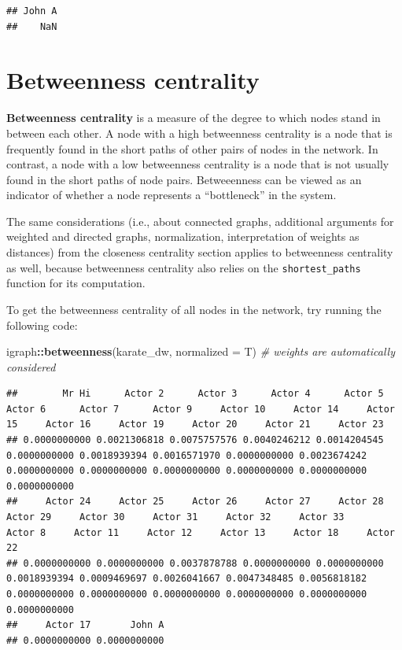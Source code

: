 \documentclass[
]{book}
\newenvironment{Shaded}{\begin{snugshade}}{\end{snugshade}}
\newcommand{\AttributeTok}[1]{\textcolor[rgb]{0.13,0.29,0.53}{#1}}
\newcommand{\CommentTok}[1]{\textcolor[rgb]{0.56,0.35,0.01}{\textit{#1}}}
\newcommand{\FunctionTok}[1]{\textcolor[rgb]{0.13,0.29,0.53}{\textbf{#1}}}
\newcommand{\NormalTok}[1]{#1}
\newcommand{\SpecialCharTok}[1]{\textcolor[rgb]{0.81,0.36,0.00}{\textbf{#1}}}
\begin{document}
\begin{verbatim}
## John A 
##    NaN
\end{verbatim}

\section{Betweenness centrality}\label{betweenness-centrality}

\textbf{Betweenness centrality} is a measure of the degree to which nodes stand in between each other. A node with a high betweenness centrality is a node that is frequently found in the short paths of other pairs of nodes in the network. In contrast, a node with a low betweenness centrality is a node that is not usually found in the short paths of node pairs. Betweeenness can be viewed as an indicator of whether a node represents a ``bottleneck'' in the system.

The same considerations (i.e., about connected graphs, additional arguments for weighted and directed graphs, normalization, interpretation of weights as distances) from the closeness centrality section applies to betweenness centrality as well, because betweenness centrality also relies on the \texttt{shortest\_paths} function for its computation.

To get the betweenness centrality of all nodes in the network, try running the following code:

\begin{Shaded}
\begin{Highlighting}[]
\NormalTok{igraph}\SpecialCharTok{::}\FunctionTok{betweenness}\NormalTok{(karate\_dw, }\AttributeTok{normalized =}\NormalTok{ T) }\CommentTok{\# weights are automatically considered}
\end{Highlighting}
\end{Shaded}

\begin{verbatim}
##        Mr Hi      Actor 2      Actor 3      Actor 4      Actor 5      Actor 6      Actor 7      Actor 9     Actor 10     Actor 14     Actor 15     Actor 16     Actor 19     Actor 20     Actor 21     Actor 23 
## 0.0000000000 0.0021306818 0.0075757576 0.0040246212 0.0014204545 0.0000000000 0.0018939394 0.0016571970 0.0000000000 0.0023674242 0.0000000000 0.0000000000 0.0000000000 0.0000000000 0.0000000000 0.0000000000 
##     Actor 24     Actor 25     Actor 26     Actor 27     Actor 28     Actor 29     Actor 30     Actor 31     Actor 32     Actor 33      Actor 8     Actor 11     Actor 12     Actor 13     Actor 18     Actor 22 
## 0.0000000000 0.0000000000 0.0037878788 0.0000000000 0.0000000000 0.0018939394 0.0009469697 0.0026041667 0.0047348485 0.0056818182 0.0000000000 0.0000000000 0.0000000000 0.0000000000 0.0000000000 0.0000000000 
##     Actor 17       John A 
## 0.0000000000 0.0000000000
\end{verbatim}
\end{document}
